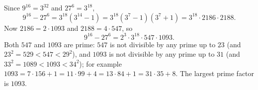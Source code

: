 Since $9^{16}=3^{32}$ and $27^6=3^{18}$,
\[9^{16}-27^6=3^{18}\left(3^{14}-1\right)=3^{18}\left(3^7-1\right)\left(3^7+1\right)=3^{18}\cdot2186\cdot2188 .\]
Now $2186=2\cdot1093$ and $2188=4\cdot547$, so
\[9^{16}-27^6=2^3\cdot3^{18}\cdot547\cdot1093 .\]
Both $547$ and $1093$ are prime: $547$ is not divisible by any prime up to $23$ (and $23^2=529<547<29^2$), and $1093$ is not divisible by any prime up to $31$ (and $33^2=1089<1093<34^2$); for example $1093=7\cdot156+1=11\cdot99+4=13\cdot84+1=31\cdot35+8$. The largest prime factor is $\boxed{1093}$.
